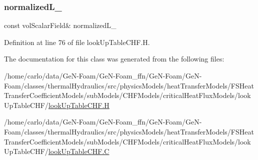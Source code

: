 \subsubsection{\texorpdfstring{normalized\+L\+\_\+}{normalizedL\_}}
{\footnotesize\ttfamily const vol\+Scalar\+Field\& normalized\+L\+\_\+\hspace{0.3cm}{\ttfamily [protected]}}



Definition at line 76 of file look\+Up\+Table\+C\+H\+F.\+H.



The documentation for this class was generated from the following files\+:\begin{DoxyCompactItemize}
\item 
/home/carlo/data/\+Ge\+N-\/\+Foam/\+Ge\+N-\/\+Foam\+\_\+ffn/\+Ge\+N-\/\+Foam/\+Ge\+N-\/\+Foam/classes/thermal\+Hydraulics/src/physics\+Models/heat\+Transfer\+Models/\+F\+S\+Heat\+Transfer\+Coefficient\+Models/sub\+Models/\+C\+H\+F\+Models/critical\+Heat\+Flux\+Models/look\+Up\+Table\+C\+H\+F/\hyperlink{lookUpTableCHF_8H}{look\+Up\+Table\+C\+H\+F.\+H}\item 
/home/carlo/data/\+Ge\+N-\/\+Foam/\+Ge\+N-\/\+Foam\+\_\+ffn/\+Ge\+N-\/\+Foam/\+Ge\+N-\/\+Foam/classes/thermal\+Hydraulics/src/physics\+Models/heat\+Transfer\+Models/\+F\+S\+Heat\+Transfer\+Coefficient\+Models/sub\+Models/\+C\+H\+F\+Models/critical\+Heat\+Flux\+Models/look\+Up\+Table\+C\+H\+F/\hyperlink{lookUpTableCHF_8C}{look\+Up\+Table\+C\+H\+F.\+C}\end{DoxyCompactItemize}
